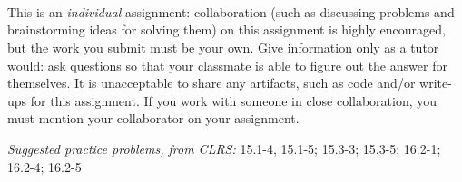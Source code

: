 \documentclass[letterpaper,11pt]{article}
\begin{document}


 \\

 \\
 \\

This is an \emph{individual} assignment: collaboration (such as discussing problems and brainstorming ideas for solving them) on this assignment is highly encouraged, but the work you submit must be your own. Give information only as a tutor would: ask questions so that your classmate is able to figure out the answer for themselves. It is unacceptable to share any artifacts, such as code and/or write-ups for this assignment. If you work with someone in close collaboration, you must mention your collaborator on your assignment.

\emph{Suggested practice problems, from CLRS:} 15.1-4, 15.1-5; 15.3-3; 15.3-5; 16.2-1; 16.2-4; 16.2-5
\end{document}
